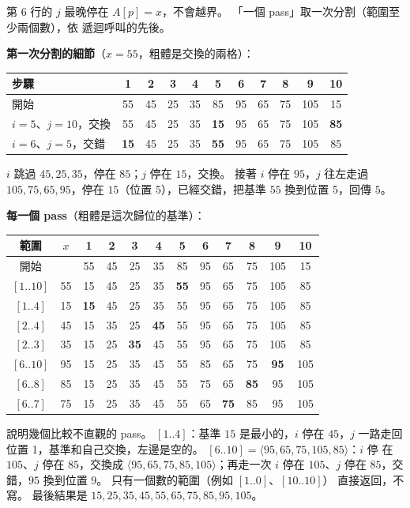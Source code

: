 第 6 行的 $j$ 最晚停在 $A[p] = x$，不會越界。 「一個 pass」取一次分割（範圍至少兩個數），依
遞迴呼叫的先後。

\textbf{第一次分割的細節}（$x = 55$，粗體是交換的兩格）：
\begin{center}
\small
\begin{tabular}{l*{10}{c}}
\toprule
步驟 & 1 & 2 & 3 & 4 & 5 & 6 & 7 & 8 & 9 & 10 \\
\midrule
開始 & 55 & 45 & 25 & 35 & 85 & 95 & 65 & 75 & 105 & 15 \\
$i = 5$、$j = 10$，交換 & 55 & 45 & 25 & 35 & \textbf{15} & 95 & 65 & 75 & 105 & \textbf{85} \\
$i = 6$、$j = 5$，交錯 & \textbf{15} & 45 & 25 & 35 & \textbf{55} & 95 & 65 & 75 & 105 & 85 \\
\bottomrule
\end{tabular}
\end{center}
$i$ 跳過 $45, 25, 35$，停在 $85$；$j$ 停在 $15$，交換。 接著 $i$ 停在 $95$，$j$ 往左走過
$105, 75, 65, 95$，停在 $15$（位置 5），已經交錯，把基準 $55$ 換到位置 5，回傳 $5$。

\textbf{每一個 pass}（粗體是這次歸位的基準）：
\begin{center}
\small
\begin{tabular}{cc*{10}{c}}
\toprule
範圍 & $x$ & 1 & 2 & 3 & 4 & 5 & 6 & 7 & 8 & 9 & 10 \\
\midrule
開始 & & 55 & 45 & 25 & 35 & 85 & 95 & 65 & 75 & 105 & 15 \\
$[1..10]$ & 55 & 15 & 45 & 25 & 35 & \textbf{55} & 95 & 65 & 75 & 105 & 85 \\
$[1..4]$ & 15 & \textbf{15} & 45 & 25 & 35 & 55 & 95 & 65 & 75 & 105 & 85 \\
$[2..4]$ & 45 & 15 & 35 & 25 & \textbf{45} & 55 & 95 & 65 & 75 & 105 & 85 \\
$[2..3]$ & 35 & 15 & 25 & \textbf{35} & 45 & 55 & 95 & 65 & 75 & 105 & 85 \\
$[6..10]$ & 95 & 15 & 25 & 35 & 45 & 55 & 85 & 65 & 75 & \textbf{95} & 105 \\
$[6..8]$ & 85 & 15 & 25 & 35 & 45 & 55 & 75 & 65 & \textbf{85} & 95 & 105 \\
$[6..7]$ & 75 & 15 & 25 & 35 & 45 & 55 & 65 & \textbf{75} & 85 & 95 & 105 \\
\bottomrule
\end{tabular}
\end{center}
說明幾個比較不直觀的 pass。 $[1..4]$：基準 $15$ 是最小的，$i$ 停在 $45$，$j$ 一路走回
位置 1，基準和自己交換，左邊是空的。 $[6..10] = \langle 95, 65, 75, 105, 85 \rangle$：$i$ 停
在 $105$、$j$ 停在 $85$，交換成 $\langle 95, 65, 75, 85, 105 \rangle$；再走一次 $i$ 停在
$105$、$j$ 停在 $85$，交錯，$95$ 換到位置 9。 只有一個數的範圍（例如 $[1..0]$、$[10..10]$）
直接返回，不寫。 最後結果是 $15, 25, 35, 45, 55, 65, 75, 85, 95, 105$。

